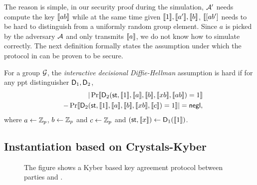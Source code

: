The reason is simple, in our security proof during the simulation, $\mathcal{A}'$ needs compute the key $\llbracket ab \rrbracket$ while at the same time given $\llbracket 1\rrbracket,\llbracket a'\rrbracket,\llbracket b\rrbracket$, $\llbracket[ab']$ needs to be hard to distinguish from a uniformly random group element. Since $a$ is picked by the adversary $\mathcal{A}$ and only transmits $\llbracket a \rrbracket$, we do not know how to simulate correctly. The next definition formally states the assumption under which the protocol in  can be proven to be secure. 

\begin{definition}
For a group $\mathcal{G}$, the \emph{interactive decisional Diffie-Hellman} assumption is hard if for any ppt distinguisher $\mathsf D_1,\mathsf D_2$,
\begin{eqnarray*}
&&|\Pr\llbracket \mathsf D_2(\mathsf{st},\llbracket 1\rrbracket,\llbracket a\rrbracket,\llbracket b\rrbracket,\llbracket xb\rrbracket,\llbracket ab\rrbracket)=1\rrbracket\\
&&-\Pr\llbracket \mathsf D_2(\mathsf{st},\llbracket 1\rrbracket,\llbracket a\rrbracket,\llbracket b\rrbracket,\llbracket xb\rrbracket,\llbracket c\rrbracket)=1\rrbracket|=\mathsf{negl},
\end{eqnarray*}
where $a\leftarrow\mathbb Z_p$, $b\leftarrow\mathbb Z_p$ and $c\leftarrow\mathbb Z_p$ and $(\mathsf{st},\llbracket x\rrbracket)\leftarrow\mathsf D_1(\llbracket 1\rrbracket)$.
\end{definition}

\subsection{Instantiation based on Crystals-Kyber}
 

\begin{figure}[h!]
\centering
{}
\label{fig:Kyber}
\caption{The figure shows a Kyber based key agreement protocol between parties \A and \B.}
\end{figure}

